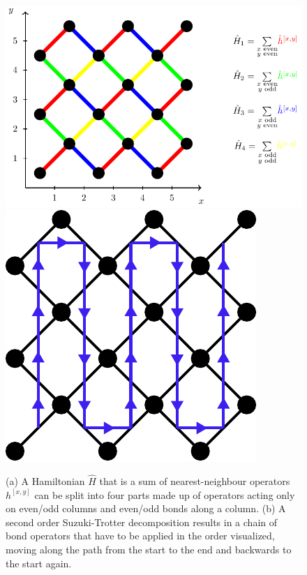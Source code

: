 \begin{figure}
	\centering
	\subcaptionbox{\label{fig:disoTPS_TEBD_global_update_TEBD1_splitting}}
	{%
		\includegraphics[scale=1]{figures/tikz/disoTPS/tebd_global_update/tebd_global_update_a.pdf}
	}
	\subcaptionbox{\label{fig:disoTPS_TEBD_global_update_TEBD2_chain}}
	{%
		\includegraphics[scale=1]{figures/tikz/disoTPS/tebd_global_update/tebd_global_update_b.pdf}
	}
	\caption{(a) A Hamiltonian $\hat{H}$ that is a sum of nearest-neighbour operators $h^{[x,y]}$ can be split into four parts made up of operators acting only on even/odd columns and even/odd bonds along a column. (b) A second order Suzuki-Trotter decomposition results in a chain of bond operators that have to be applied in the order visualized, moving along the path from the start to the end and backwards to the start again.}
	\label{fig:disoTPS_TEBD_global_update_TEBD1_splitting_and_TEBD2_chain}
\end{figure}
